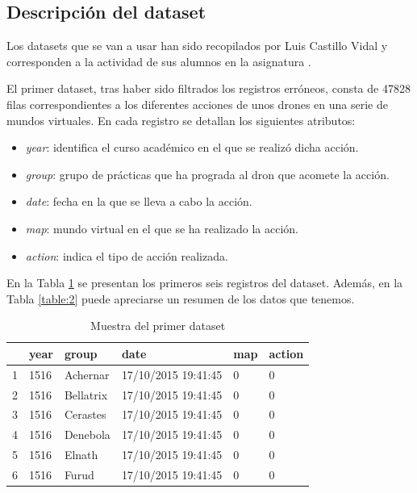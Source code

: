 \subsection{Descripción del dataset}

Los datasets que se van a usar han sido recopilados por Luis Castillo Vidal y corresponden a la actividad de sus alumnos en la asignatura \href{https://www.ugr.es/estudiantes/grados/grado-ingenieria-informatica/desarrollo-basado-agentes-ing-software}{\color{blue}{Desarrollo Basado en Agentes}}.

El primer dataset, tras haber sido filtrados los registros erróneos, consta de 47828 filas correspondientes a los diferentes acciones de unos drones en una serie de mundos virtuales. En cada registro se detallan los siguientes atributos:
\begin{itemize}
\item \emph{year}: identifica el curso académico en el que se realizó dicha acción.
\item \emph{group}: grupo de prácticas que ha prograda al dron que acomete la acción.
\item \emph{date}: fecha en la que se lleva a cabo la acción.
\item \emph{map}: mundo virtual en el que se ha realizado la acción.
\item \emph{action}: indica el tipo de acción realizada.
\end{itemize}

En la Tabla \ref{table:1} se presentan los primeros seis registros del dataset. Además, en la Tabla \ref{table:2} puede apreciarse un resumen de los datos que tenemos.

\begin{table}[ht]
\centering
\begin{tabular}{rlllll}
  \hline
 & year & group & date & map & action \\ 
  \hline
1 & 1516 & Achernar & 17/10/2015 19:41:45 & 0 & 0 \\ 
  2 & 1516 & Bellatrix & 17/10/2015 19:41:45 & 0 & 0 \\ 
  3 & 1516 & Cerastes & 17/10/2015 19:41:45 & 0 & 0 \\ 
  4 & 1516 & Denebola & 17/10/2015 19:41:45 & 0 & 0 \\ 
  5 & 1516 & Elnath & 17/10/2015 19:41:45 & 0 & 0 \\ 
  6 & 1516 & Furud & 17/10/2015 19:41:45 & 0 & 0 \\ 
   \hline
\end{tabular}
\caption{Muestra del primer dataset}
\label{table:1}
\end{table}

